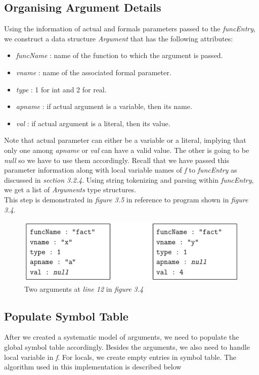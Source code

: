 \documentclass[12pt,oneside]{book}
\begin{document}
\subsection{Organising Argument Details}
Using the information of actual and formals parameters passed to the \textit{funcEntry}, we construct a data structure \textit{Argument} that has the following attributes: 
\begin{itemize}
 \item \textit{funcName} : name of the function to which the argument is passed.
 \item \textit{vname} : name of the associated formal parameter.
  \item \textit{type} : 1 for int and 2 for real.
 \item \textit{apname} : if actual argument is a variable, then its name.
  \item \textit{val} : if actual argument is a literal, then its value. 
\end{itemize}
Note that actual parameter can either be a variable or a literal, implying that only one among \textit{apname} or \textit{val} can have a valid value. The other is going to be \textit{null} so we have to use them accordingly. Recall that we have passed this parameter information along with local variable names of \textit{f} to \textit{funcEntry} as discussed in \textit{section 3.2.4}. Using string tokenizing and parsing within \textit{funcEntry}, we get a list of \textit{Arguments} type structures.\\
This step is demonstrated in \textit{figure 3.5} in reference to program shown in \textit{figure 3.4}.

\vspace{0.4cm}
\begin{figure}[htbp]
\centering
\includegraphics[scale=0.60]{arguments1.png}
\caption{Two arguments at \textit{line 12} in \textit{figure 3.4}}
\end{figure}

\newpage

\subsection{Populate Symbol Table}
After we created a systematic model of arguments, we need to populate the global symbol table accordingly. Besides the arguments, we also need to handle local variable in \textit{f}. For locals, we create empty entries in symbol table. The algorithm used in this implementation is described below
\end{document}
